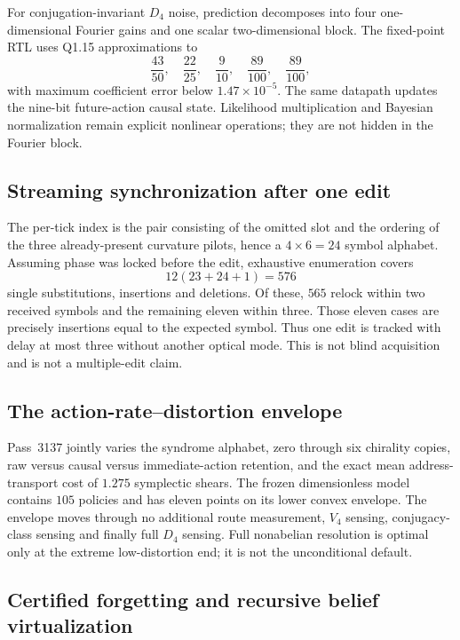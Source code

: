 For conjugation-invariant $D_4$ noise, prediction decomposes into four one-dimensional
Fourier gains and one scalar two-dimensional block.  The fixed-point RTL uses Q1.15
approximations to
\[
 \frac{43}{50},\quad\frac{22}{25},\quad\frac9{10},\quad
 \frac{89}{100},\quad\frac{89}{100},
\]
with maximum coefficient error below $1.47\times10^{-5}$.  The same datapath updates the
nine-bit future-action causal state.  Likelihood multiplication and Bayesian normalization
remain explicit nonlinear operations; they are not hidden in the Fourier block.

\subsection{Streaming synchronization after one edit}

The per-tick index is the pair consisting of the omitted slot and the ordering of the three
already-present curvature pilots, hence a $4\times6=24$ symbol alphabet.  Assuming phase
was locked before the edit, exhaustive enumeration covers
\[
 12(23+24+1)=576
\]
single substitutions, insertions and deletions.  Of these, $565$ relock within two received
symbols and the remaining eleven within three.  Those eleven cases are precisely
insertions equal to the expected symbol.  Thus one edit is tracked with delay at most three
without another optical mode.  This is not blind acquisition and is not a multiple-edit
claim.

\subsection{The action-rate--distortion envelope}

Pass~3137 jointly varies the syndrome alphabet, zero through six chirality copies, raw
versus causal versus immediate-action retention, and the exact mean address-transport cost
of $1.275$ symplectic shears.  The frozen dimensionless model contains $105$ policies and
has eleven points on its lower convex envelope.  The envelope moves through no additional
route measurement, $V_4$ sensing, conjugacy-class sensing and finally full $D_4$ sensing.
Full nonabelian resolution is optimal only at the extreme low-distortion end; it is not the
unconditional default.

\subsection{Certified forgetting and recursive belief virtualization}

